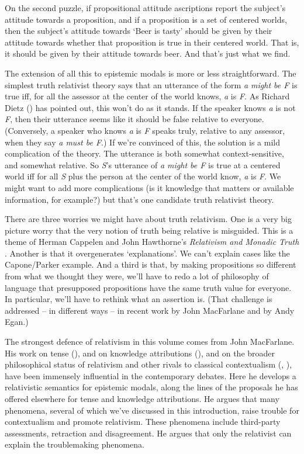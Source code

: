 \documentclass[
  11pt,
  letterpaper,
  DIV=11,
  numbers=noendperiod,
  twoside]{scrartcl}
\begin{document}
On the second puzzle, if propositional attitude ascriptions report the
subject's attitude towards a proposition, and if a proposition is a set
of centered worlds, then the subject's attitude towards `Beer is tasty'
should be given by their attitude towards whether that proposition is
true in their centered world. That is, it should be given by their
attitude towards beer. And that's just what we find.

The extension of all this to epistemic modals is more or less
straightforward. The simplest truth relativist theory says that an
utterance of the form \emph{a might be F} is true iff, for all the
assessor at the center of the world knows, \emph{a} is \emph{F}. As
Richard Dietz () has pointed out, this
won't do as it stands. If the speaker knows \emph{a} is not \emph{F},
then their utterance seems like it should be false relative to everyone.
(Conversely, a speaker who knows \emph{a} is \emph{F} speaks truly,
relative to any assessor, when they say \emph{a must be F}.) If we're
convinced of this, the solution is a mild complication of the theory.
The utterance is both somewhat context-sensitive, and somewhat relative.
So \emph{S}'s utterance of \emph{a might be F} is true at a centered
world iff for all \emph{S} plus the person at the center of the world
know, \emph{a} is \emph{F}. We might want to add more complications (is
it knowledge that matters or available information, for example?) but
that's one candidate truth relativist theory.

There are three worries we might have about truth relativism. One is a
very big picture worry that the very notion of truth being relative is
misguided. This is a theme of Herman Cappelen and John Hawthorne's
\emph{Relativism and Monadic Truth} . Another is that it overgenerates
`explanations'. We can't explain cases like the Capone/Parker example.
And a third is that, by making propositions so different from what we
thought they were, we'll have to redo a lot of philosophy of language
that presupposed propositions have the same truth value for everyone. In
particular, we'll have to rethink what an assertion is. (That challenge
is addressed -- in different ways -- in recent work by John MacFarlane
and by Andy Egan.)

The strongest defence of relativism in this volume comes from John
MacFarlane. His work on tense
(), and on
knowledge attributions
(), and on the
broader philosophical status of relativism and other rivals to classical
contextualism (,
), have been immensely
influential in the contemporary debates. Here he develops a relativistic
semantics for epistemic modals, along the lines of the proposals he has
offered elsewhere for tense and knowledge attributions. He argues that
many phenomena, several of which we've discussed in this introduction,
raise trouble for contextualism and promote relativism. These phenomena
include third-party assessments, retraction and disagreement. He argues
that only the relativist can explain the troublemaking phenomena.
\end{document}
